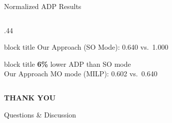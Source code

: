 \documentclass[aspectratio=169,10pt]{beamer}
\newcommand{\slidenavigation}{}
\newcommand{\slideposition}{}
\begin{document}
\begin{frame}[label=summary-17]{Normalized ADP Results}
\begin{columns}[T,onlytextwidth]
\begin{column}{.44\textwidth}
\begin{beamercolorbox}[rounded=true,sep=.10cm,wd=\linewidth]{block title}
        {\scriptsize\color{Muted}Our Approach (SO Mode): 0.640 vs.\ 1.000}
      \end{beamercolorbox}
      \vspace{.06cm}
      \begin{beamercolorbox}[rounded=true,sep=.10cm,wd=\linewidth]{block title}
        {\fontsize{18}{20}\selectfont\bfseries\color{Accent}6\%}\quad
        {\footnotesize\color{Ink}lower ADP than SO mode}\\[1pt]
        {\scriptsize\color{Muted}Our Approach MO mode (MILP): 0.602 vs.\ 0.640}
      \end{beamercolorbox}
    \end{column}
  \end{columns}
\end{frame}



{
\renewcommand{\slidenavigation}{\hyperlink{details-index}{\beamerbutton{Details index}}}
\renewcommand{\slideposition}{Summary 18 / 18}
\begin{frame}[plain,label=summary-18]
  \centering
  \vfill
  {\fontsize{36}{42}\selectfont\bfseries\color{Ink}THANK YOU}\par
  \vspace{.37cm}
  {\fontsize{19}{24}\selectfont\color{Muted}Questions \& Discussion}\par
  \vfill
\hyperlink{details-index}{}\par\vspace{.30cm}
\end{frame}}
\end{document}
